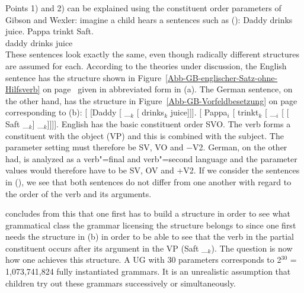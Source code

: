 Points 1) and 2) can be explained using the constituent order parameters of Gibson and Wexler:
imagine a child hears a sentences such as ():
\eal
\ex Daddy drinks juice.
\ex 
\gll Pappa trinkt Saft.\\
	 daddy drinks juice\\
\zl
These sentences look exactly the same, even though radically different structures are assumed for each.
According to the theories under discussion, the English sentence has the structure shown in Figure~\ref{Abb-GB-englischer-Satz-ohne-Hilfsverb} on
page~\pageref{Abb-GB-englischer-Satz-ohne-Hilfsverb} given in abbreviated form in (a).
The German sentence, on the other hand, has the structure in Figure~\ref{Abb-GB-Vorfeldbesetzung} 
on page~\pageref{Abb-GB-Vorfeldbesetzung} corresponding to (b):
\eal
\ex {}[ [Daddy [ \_$_k$ [ drinks$_k$ juice]]].
\ex {}[ Pappa$_i$ [ trinkt$_k$ [ \_$_i$ [ [ Saft \_$_k$] \_$_k$]]]].
\zl
English has the basic constituent order SVO. The verb forms a constituent with the object (VP) and this
is combined with the subject. The parameter setting must therefore be SV, VO and $-$V2. German,
on the other had, is analyzed as a verb"=final and verb"=second language and the parameter values
would therefore have to be SV, OV and +V2. If we consider the sentences in (), we see that
both sentences do not differ from one another with regard to the order of the verb and its arguments.

\citet{Fodor98a,Fodor98b} concludes from this that one first has to build a structure in order to see
what grammatical class the grammar licensing the structure belongs to since one first needs the structure
in (b) in order to be able to see
that the verb in the partial constituent occurs after its argument in the VP (Saft \_$_k$). The question is now how one achieves
this structure. A UG with 30 parameters corresponds to 2$^{30}$ = 1,073,741,824 fully instantiated grammars.
It is an unrealistic assumption that children try out these grammars successively or simultaneously.

